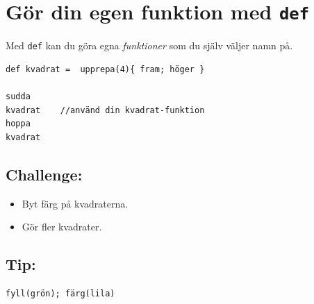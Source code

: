 \chapter{Gör din egen funktion med \lstinline{def}}Med \lstinline{def} kan du göra egna {\it funktioner} som du själv väljer namn på.

\begin{lstlisting}[basicstyle={\ttfamily\fontsize{20}{24}\selectfont},numbers=none]
def kvadrat =  upprepa(4){ fram; höger }  

sudda
kvadrat    //använd din kvadrat-funktion
hoppa
kvadrat
\end{lstlisting}
        
\section*{\color{BrickRed}Challenge:}


\begin{itemize}

\item {Byt färg på kvadraterna.}
\item {Gör fler kvadrater.}

\end{itemize}


\section*{\color{OliveGreen}Tip:}

\begin{lstlisting}[numbers=none]
fyll(grön); färg(lila)
\end{lstlisting}
        
